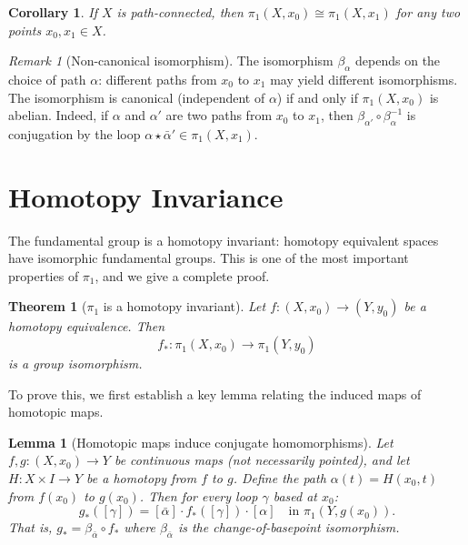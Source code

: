 \documentclass[12pt,a4paper,openany]{book}
\theoremstyle{definition}
\theoremstyle{plain}
\newtheorem{theorem}[definition]{Theorem}
\newtheorem{lemma}[definition]{Lemma}
\newtheorem{corollary}[definition]{Corollary}
\theoremstyle{remark}
\newtheorem{remark}[definition]{Remark}
\begin{document}
\begin{corollary}\label{cor:pi1-path-connected}
If $X$ is path-connected, then $\pi_1(X, x_0) \cong \pi_1(X, x_1)$ for any two
points $x_0, x_1 \in X$.
\end{corollary}

\begin{remark}[Non-canonical isomorphism]\label{rem:non-canonical}
The isomorphism $\beta_\alpha$ depends on the choice of path $\alpha$: different
paths from $x_0$ to $x_1$ may yield different isomorphisms. The isomorphism is
canonical (independent of $\alpha$) if and only if $\pi_1(X, x_0)$ is abelian.
Indeed, if $\alpha$ and $\alpha'$ are two paths from $x_0$ to $x_1$, then
$\beta_{\alpha'} \circ \beta_\alpha^{-1}$ is conjugation by the loop $\alpha
\star \bar{\alpha}' \in \pi_1(X, x_1)$.
\end{remark}


\section{Homotopy Invariance}\label{sec:homotopy-invariance}

The fundamental group is a homotopy invariant: homotopy equivalent spaces have
isomorphic fundamental groups. This is one of the most important properties of
$\pi_1$, and we give a complete proof.

\begin{theorem}[{$\pi_1$ is a homotopy invariant}]\label{thm:pi1-homotopy-invariant}
Let $f \colon (X, x_0) \to (Y, y_0)$ be a homotopy equivalence. Then
\[
  f_* \colon \pi_1(X, x_0) \to \pi_1(Y, y_0)
\]
is a group isomorphism.
\end{theorem}

To prove this, we first establish a key lemma relating the induced maps of
homotopic maps.

\begin{lemma}[Homotopic maps induce conjugate homomorphisms]\label{lem:homotopic-maps-pi1}
Let $f, g \colon (X, x_0) \to Y$ be continuous maps (not necessarily pointed),
and let $H \colon X \times I \to Y$ be a homotopy from $f$ to $g$. Define the
path $\alpha(t) = H(x_0, t)$ from $f(x_0)$ to $g(x_0)$. Then for every loop
$\gamma$ based at $x_0$:
\[
  g_*([\gamma]) = [\bar{\alpha}] \cdot f_*([\gamma]) \cdot [\alpha]
  \quad \text{in } \pi_1(Y, g(x_0)).
\]
That is, $g_* = \beta_{\bar{\alpha}} \circ f_*$ where $\beta_{\bar{\alpha}}$ is
the change-of-basepoint isomorphism.
\end{lemma}
\end{document}
